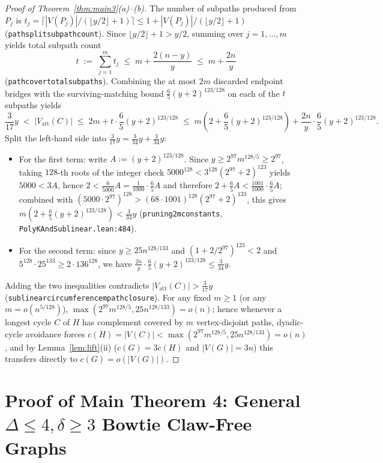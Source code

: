 \documentclass[11pt,reqno]{amsart}
\theoremstyle{plain}
\theoremstyle{definition}
\theoremstyle{remark}
\newcommand{\Vatt}{V_{\mathrm{att}}}
\DeclareRobustCommand{\_}{\ifmmode\text{\textunderscore}\else\textunderscore\allowbreak\fi}
\begin{document}
\begin{proof}[Proof of Theorem~\ref{thm:main3}(a)--(b)]
The number of subpaths produced from $P_j$ is $t_j = \lceil |V(P_j)| / (\lfloor y/2 \rfloor + 1) \rceil \le 1 + |V(P_j)| / (\lfloor y/2 \rfloor + 1)$ (\texttt{path\_split\_subpath\_count}). Since $\lfloor y/2 \rfloor + 1 > y/2$, summing over $j = 1, \dots, m$ yields total subpath count
\[
  t \;:=\; \sum_{j=1}^m t_j \;\le\; m + \frac{2(n - y)}{y} \;\le\; m + \frac{2n}{y}
\]
(\texttt{path\_cover\_total\_subpaths}). Combining the at most $2m$ discarded endpoint bridges with the surviving-matching bound $\frac{6}{5}(y + 2)^{123/128}$ on each of the $t$ subpaths yields
\[
  \frac{3}{17} y \;<\; |\Vatt(C)| \;\le\; 2m + t \cdot \frac{6}{5}(y + 2)^{123/128}
  \;\le\; m\!\left(2 + \frac{6}{5}(y + 2)^{123/128}\right) + \frac{2n}{y}\cdot \frac{6}{5}(y + 2)^{123/128}.
\]
Split the left-hand side into $\frac{3}{17} y = \frac{3}{34} y + \frac{3}{34} y$:
\begin{itemize}[leftmargin=1.6em]
  \item For the first term: write $A := (y + 2)^{123/128}$. Since $y \ge 2^{97} m^{128/5} \ge 2^{97}$, taking $128$-th roots of the integer check $5000^{128} < 3^{128}(2^{97} + 2)^{123}$ yields $5000 < 3A$, hence $2 < \frac{6}{5000} A = \frac{1}{1000}\cdot \frac{6}{5} A$ and therefore $2 + \frac{6}{5} A < \frac{1001}{1000}\cdot \frac{6}{5} A$; combined with $(5000 \cdot 2^{97})^{128} > (68 \cdot 1001)^{128} (2^{97}+2)^{123}$, this gives $m(2 + \frac{6}{5}(y+2)^{123/128}) < \frac{3}{34} y$ (\texttt{pruning\_2m\_constants}, \texttt{PolyKAndSublinear.lean:484}).
  \item For the second term: since $y \ge 25 n^{128/133}$ and $(1 + 2/2^{97})^{123} < 2$ and $5^{128} \cdot 25^{133} \ge 2 \cdot 136^{128}$, we have $\frac{2n}{y} \cdot \frac{6}{5}(y + 2)^{123/128} \le \frac{3}{34} y$.
\end{itemize}
Adding the two inequalities contradicts $|\Vatt(C)| > \frac{3}{17} y$ (\texttt{sublinear\_circumference\_m\_path\_closure}). For any fixed $m \ge 1$ (or any $m = o(n^{5/128})$), $\max(2^{97} m^{128/5}, 25 n^{128/133}) = o(n)$; hence whenever a longest cycle $C$ of $H$ has complement covered by $m$ vertex-disjoint paths, dyadic-cycle avoidance forces $c(H) = |V(C)| < \max(2^{97} m^{128/5}, 25 n^{128/133}) = o(n)$, and by Lemma~\ref{lem:lift}(ii) ($c(G) = 3 c(H)$ and $|V(G)| = 3n$) this transfers directly to $c(G) = o(|V(G)|)$.
\end{proof}

\section{Proof of Main Theorem 4: General \texorpdfstring{$\Delta \le 4, \delta \ge 3$}{Delta <= 4, delta >= 3} Bowtie Claw-Free Graphs}\label{sec:bowties}
\end{document}
